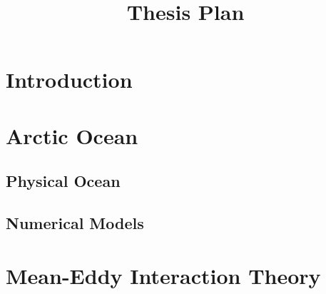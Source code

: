 \documentclass[10pt,a4paper]{article}
\title{Thesis Plan}
\begin{document}
\maketitle


\section{Introduction}

\section{Arctic Ocean}

\subsection{Physical Ocean}

\subsection{Numerical Models}

\section{Mean-Eddy Interaction Theory}
\end{document}
